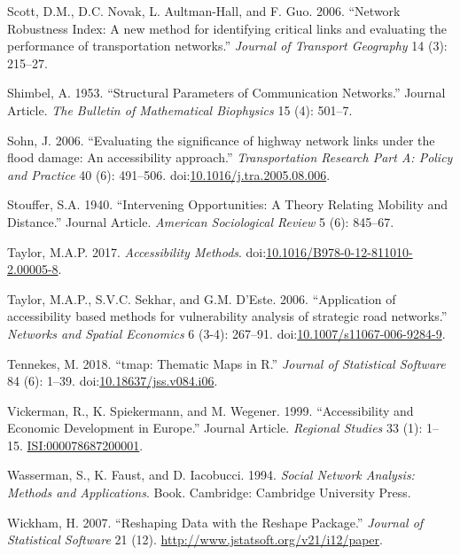 \documentclass[]{elsarticle} %
\begin{document}
\hypertarget{ref-Scott2006}{}
Scott, D.M., D.C. Novak, L. Aultman-Hall, and F. Guo. 2006. ``Network
Robustness Index: A new method for identifying critical links and
evaluating the performance of transportation networks.'' \emph{Journal
of Transport Geography} 14 (3): 215--27.

\hypertarget{ref-Shimbel1953}{}
Shimbel, A. 1953. ``Structural Parameters of Communication Networks.''
Journal Article. \emph{The Bulletin of Mathematical Biophysics} 15 (4):
501--7.

\hypertarget{ref-Sohn2006}{}
Sohn, J. 2006. ``Evaluating the significance of highway network links
under the flood damage: An accessibility approach.''
\emph{Transportation Research Part A: Policy and Practice} 40 (6):
491--506.
doi:\href{https://doi.org/10.1016/j.tra.2005.08.006}{10.1016/j.tra.2005.08.006}.

\hypertarget{ref-Stouffer1940}{}
Stouffer, S.A. 1940. ``Intervening Opportunities: A Theory Relating
Mobility and Distance.'' Journal Article. \emph{American Sociological
Review} 5 (6): 845--67.

\hypertarget{ref-Taylor2017}{}
Taylor, M.A.P. 2017. \emph{Accessibility Methods}.
doi:\href{https://doi.org/10.1016/B978-0-12-811010-2.00005-8}{10.1016/B978-0-12-811010-2.00005-8}.

\hypertarget{ref-Taylor2006}{}
Taylor, M.A.P., S.V.C. Sekhar, and G.M. D'Este. 2006. ``Application of
accessibility based methods for vulnerability analysis of strategic road
networks.'' \emph{Networks and Spatial Economics} 6 (3-4): 267--91.
doi:\href{https://doi.org/10.1007/s11067-006-9284-9}{10.1007/s11067-006-9284-9}.

\hypertarget{ref-Tennekes2018tmap}{}
Tennekes, M. 2018. ``tmap: Thematic Maps in R.'' \emph{Journal of
Statistical Software} 84 (6): 1--39.
doi:\href{https://doi.org/10.18637/jss.v084.i06}{10.18637/jss.v084.i06}.

\hypertarget{ref-Vickerman1999}{}
Vickerman, R., K. Spiekermann, and M. Wegener. 1999. ``Accessibility and
Economic Development in Europe.'' Journal Article. \emph{Regional
Studies} 33 (1): 1--15. \url{ISI:000078687200001}.

\hypertarget{ref-Wasserman1994social}{}
Wasserman, S., K. Faust, and D. Iacobucci. 1994. \emph{Social Network
Analysis: Methods and Applications}. Book. Cambridge: Cambridge
University Press.

\hypertarget{ref-Wickham2007reshape}{}
Wickham, H. 2007. ``Reshaping Data with the Reshape Package.''
\emph{Journal of Statistical Software} 21 (12).
\url{http://www.jstatsoft.org/v21/i12/paper}.
\end{document}
